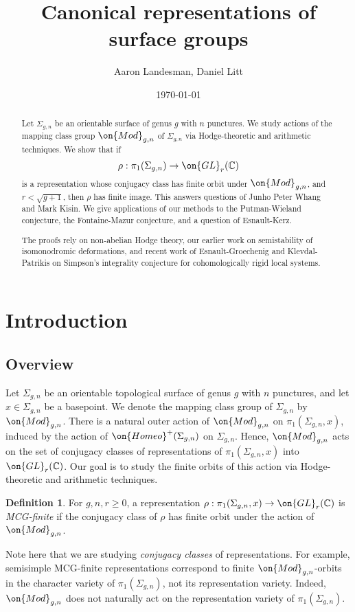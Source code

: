 \documentclass[12 pt]{amsart}
\title{Canonical representations of surface groups}
\author{Aaron Landesman, Daniel Litt}
\date{\today}
\theoremstyle{plain}
\theoremstyle{definition}
\newtheorem{definition}[subsubsection]{Definition}
\theoremstyle{remark}
\numberwithin{equation}{section}
\begin{document}
\begin{abstract}
Let $\Sigma_{g,n}$ be an orientable surface of genus $g$ with $n$ punctures. We study actions of the mapping class group $\on{Mod}_{g,n}$ of 
$\Sigma_{g,n}$ via Hodge-theoretic and arithmetic techniques.  We show that if
$$\rho: \pi_1(\Sigma_{g,n})\to \on{GL}_r(\mathbb{C})$$ is a representation whose
conjugacy class has finite orbit under $\on{Mod}_{g,n}$, and $r<\sqrt{g+1}$,
then $\rho$ has finite image. 
This answers questions of Junho Peter Whang and Mark Kisin.  We give applications of our methods to 
the Putman-Wieland conjecture,
the Fontaine-Mazur conjecture, 
and a question of Esnault-Kerz. 

The proofs rely on non-abelian Hodge theory, our earlier work on semistability
of isomonodromic deformations, and recent work of Esnault-Groechenig and Klevdal-Patrikis
on Simpson's integrality conjecture for cohomologically rigid local systems.
\end{abstract}


\maketitle
\setcounter{tocdepth}{1}
\tableofcontents

\section{Introduction}
\label{section:introduction}
\subsection{Overview}
\label{subsection:overview}
Let $\Sigma_{g,n}$ be an orientable topological surface of genus $g$ with $n$ punctures, and let $x\in\Sigma_{g,n}$ be a basepoint.
We denote the mapping class group of $\Sigma_{g,n}$ by $\on{Mod}_{g,n}$. 
There is a natural outer action of $\on{Mod}_{g,n}$ on $\pi_1(\Sigma_{g,n},x)$, induced by the action of $\on{Homeo}^+(\Sigma_{g,n})$ on $\Sigma_{g,n}$. 
Hence, $\on{Mod}_{g,n}$ acts on the set of conjugacy classes of
representations of $\pi_1(\Sigma_{g,n},x)$ into $\on{GL}_r(\mathbb{C})$. Our goal is to study the finite orbits of this action
via Hodge-theoretic and arithmetic techniques. 

\begin{definition}
	\label{definition:mcg-finite}
	For $g,n,r \geq 0$,
	a representation $\rho: \pi_1(\Sigma_{g,n},x) \to \on{GL}_r(\mathbb C)$
	is {\em MCG-finite} if the conjugacy class of $\rho$ has finite orbit under the action of
	$\on{Mod}_{g,n}$.
\end{definition}
Note here that we are studying \emph{conjugacy classes} of representations. For
example, semisimple MCG-finite representations correspond to finite
$\on{Mod}_{g,n}$-orbits in the character variety of $\pi_1(\Sigma_{g,n})$, not
its representation variety. Indeed, $\on{Mod}_{g,n}$ does not naturally act on
the representation variety of $\pi_1(\Sigma_{g,n})$.
\end{document}
